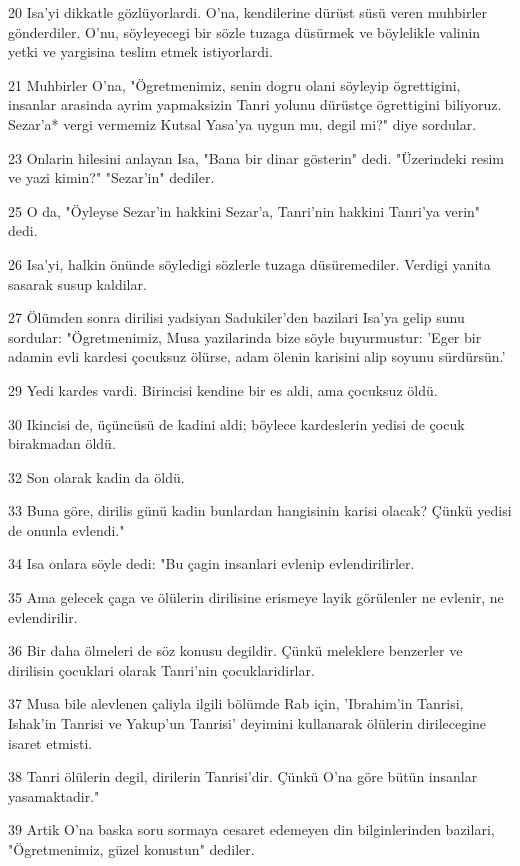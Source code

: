 \par 20 Isa'yi dikkatle gözlüyorlardi. O'na, kendilerine dürüst süsü veren muhbirler gönderdiler. O'nu, söyleyecegi bir sözle tuzaga düsürmek ve böylelikle valinin yetki ve yargisina teslim etmek istiyorlardi.
\par 21 Muhbirler O'na, "Ögretmenimiz, senin dogru olani söyleyip ögrettigini, insanlar arasinda ayrim yapmaksizin Tanri yolunu dürüstçe ögrettigini biliyoruz. Sezar'a* vergi vermemiz Kutsal Yasa'ya uygun mu, degil mi?" diye sordular.
\par 23 Onlarin hilesini anlayan Isa, "Bana bir dinar gösterin" dedi. "Üzerindeki resim ve yazi kimin?" "Sezar'in" dediler.
\par 25 O da, "Öyleyse Sezar'in hakkini Sezar'a, Tanri'nin hakkini Tanri'ya verin" dedi.
\par 26 Isa'yi, halkin önünde söyledigi sözlerle tuzaga düsüremediler. Verdigi yanita sasarak susup kaldilar.
\par 27 Ölümden sonra dirilisi yadsiyan Sadukiler'den bazilari Isa'ya gelip sunu sordular: "Ögretmenimiz, Musa yazilarinda bize söyle buyurmustur: 'Eger bir adamin evli kardesi çocuksuz ölürse, adam ölenin karisini alip soyunu sürdürsün.'
\par 29 Yedi kardes vardi. Birincisi kendine bir es aldi, ama çocuksuz öldü.
\par 30 Ikincisi de, üçüncüsü de kadini aldi; böylece kardeslerin yedisi de çocuk birakmadan öldü.
\par 32 Son olarak kadin da öldü.
\par 33 Buna göre, dirilis günü kadin bunlardan hangisinin karisi olacak? Çünkü yedisi de onunla evlendi."
\par 34 Isa onlara söyle dedi: "Bu çagin insanlari evlenip evlendirilirler.
\par 35 Ama gelecek çaga ve ölülerin dirilisine erismeye layik görülenler ne evlenir, ne evlendirilir.
\par 36 Bir daha ölmeleri de söz konusu degildir. Çünkü meleklere benzerler ve dirilisin çocuklari olarak Tanri'nin çocuklaridirlar.
\par 37 Musa bile alevlenen çaliyla ilgili bölümde Rab için, 'Ibrahim'in Tanrisi, Ishak'in Tanrisi ve Yakup'un Tanrisi' deyimini kullanarak ölülerin dirilecegine isaret etmisti.
\par 38 Tanri ölülerin degil, dirilerin Tanrisi'dir. Çünkü O'na göre bütün insanlar yasamaktadir."
\par 39 Artik O'na baska soru sormaya cesaret edemeyen din bilginlerinden bazilari, "Ögretmenimiz, güzel konustun" dediler.
